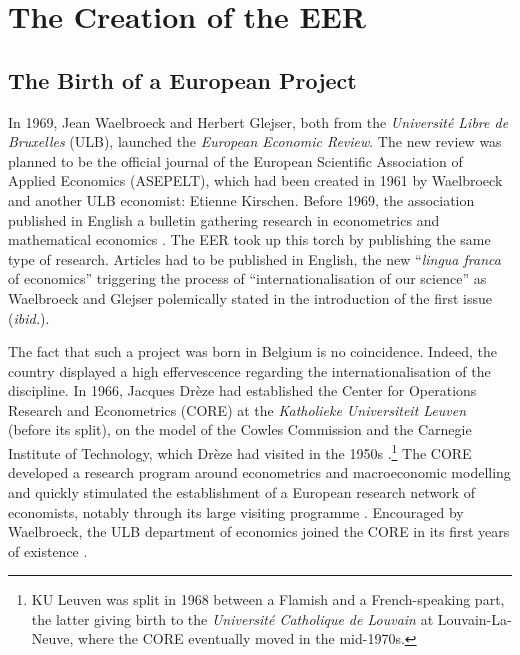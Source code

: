 \documentclass[]{elsarticle} %
\begin{document}
\hypertarget{EER-creation}{%
\section{The Creation of the EER}\label{EER-creation}}

\hypertarget{the-birth-of-a-european-project}{%
\subsection{The Birth of a European
Project}\label{the-birth-of-a-european-project}}

In 1969, Jean Waelbroeck and Herbert Glejser, both from the
\emph{Université Libre de Bruxelles} (ULB), launched the \emph{European
Economic Review}. The new review was planned to be the official journal
of the European Scientific Association of Applied Economics (ASEPELT),
which had been created in 1961 by Waelbroeck and another ULB economist:
Etienne Kirschen. Before 1969, the association published in English a
bulletin gathering research in econometrics and mathematical economics
\citep[4]{waelbroeck1969}. The EER took up this torch by publishing the
same type of research. Articles had to be published in English, the new
``\emph{lingua franca} of economics'' triggering the process of
``internationalisation of our science'' as Waelbroeck and Glejser
polemically stated in the introduction of the first issue
(\emph{ibid.}).

The fact that such a project was born in Belgium is no coincidence.
Indeed, the country displayed a high effervescence regarding the
internationalisation of the discipline. In 1966, Jacques Drèze had
established the Center for Operations Research and Econometrics (CORE)
at the \emph{Katholieke Universiteit Leuven} (before its split), on the
model of the Cowles Commission and the Carnegie Institute of Technology,
which Drèze had visited in the 1950s \citep{duppe2017}.\footnote{KU
  Leuven was split in 1968 between a Flamish and a French-speaking part,
  the latter giving birth to the \emph{Université Catholique de Louvain}
  at Louvain-La-Neuve, where the CORE eventually moved in the mid-1970s.}
The CORE developed a research program around econometrics and
macroeconomic modelling and quickly stimulated the establishment of a
European research network of economists, notably through its large
visiting programme \citep{maes2005, duppe2017}. Encouraged by
Waelbroeck, the ULB department of economics joined the CORE in its first
years of existence \citep[79]{maes2005}.
\end{document}
